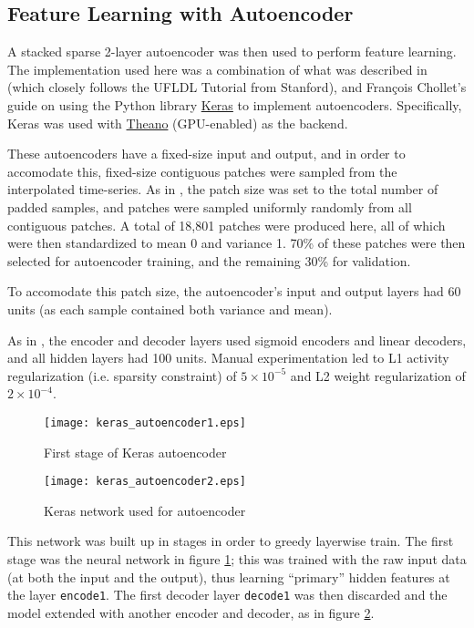 \documentclass[journal]{IEEEtran}
\begin{document}
\subsection{Feature Learning with Autoencoder}

A stacked sparse 2-layer autoencoder was then used to perform feature
learning.  The implementation used here was a combination of what was
described in \cite{Lasko2013} (which closely follows the UFLDL
Tutorial from Stanford\cite{Ng}), and Fran\c cois Chollet's
guide\cite{Chollet} on using the Python library
\href{https://keras.io/}{Keras} to implement autoencoders.
Specifically, Keras was used with
\href{http://deeplearning.net/software/theano/}{Theano} (GPU-enabled)
as the backend.

These autoencoders have a fixed-size input and output, and in order to
accomodate this, fixed-size contiguous patches were sampled from the
interpolated time-series.  As in \cite{Lasko2013}, the patch size was
set to the total number of padded samples, and patches were sampled
uniformly randomly from all contiguous patches.  A total of 18,801
patches were produced here, all of which were then standardized to
mean 0 and variance 1.  70\% of these patches were then selected for
autoencoder training, and the remaining 30\% for validation.

To accomodate this patch size, the autoencoder's input and output
layers had 60 units (as each sample contained both variance and mean).

As in \cite{Lasko2013}, the encoder and decoder layers used sigmoid
encoders and linear decoders, and all hidden layers had 100 units.
Manual experimentation led to L1 activity regularization
(i.e. sparsity constraint) of $5\times10^{-5}$ and L2 weight
regularization of $2\times10^{-4}$.

\begin{figure}
  \texttt{[image: keras\_autoencoder1.eps]}
  \caption{First stage of Keras autoencoder}
  \label{fig:keras_autoencoder1}
\end{figure}

\begin{figure}
  \texttt{[image: keras\_autoencoder2.eps]}
  \caption{Keras network used for autoencoder}
  \label{fig:keras_autoencoder2}
\end{figure}

This network was built up in stages in order to greedy layerwise
train\cite{Ng}.  The first stage was the neural network in figure
\ref{fig:keras_autoencoder1}; this was trained with the raw input data
(at both the input and the output), thus learning ``primary'' hidden
features at the layer \texttt{encode1}.  The first decoder layer
\texttt{decode1} was then discarded and the model extended with
another encoder and decoder, as in figure
\ref{fig:keras_autoencoder2}.
\end{document}

